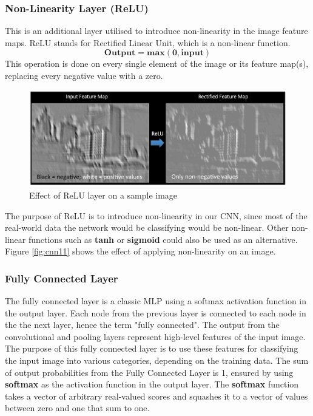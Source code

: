 \subsubsection*{Non-Linearity Layer (ReLU)}
\label{sect5_1_2_1a_c}
This is an additional layer utilised to introduce non-linearity in the image feature maps. ReLU stands for Rectified Linear Unit, which is a non-linear function.
\begin{equation}
\mathbf{Output = max(0, input)}
\end{equation}
This operation is done on every single element of the image or its feature map(s), replacing every negative value with a zero.
\begin{figure}[h!]
\centering
\includegraphics[width=12cm]{figures/Effect_ReLu.png}
\caption{Effect of ReLU layer on a sample image}
\label{fig:cnn13}
\end{figure}
The purpose of ReLU is to introduce non-linearity in our CNN, since most of the real-world data the network would be classifying would be non-linear. Other non-linear functions such as \textbf{tanh} or \textbf{sigmoid} could also be used as an alternative. Figure \ref{fig:cnn11} shows the effect of applying non-linearity on an image.

\subsubsection*{Fully Connected Layer}
\label{sect5_1_2_1a_d}

The fully connected layer is a classic \ac{MLP} using a softmax activation function in the output layer. Each node from the previous layer is connected to each node in the the next layer, hence the term "fully connected".\newline\newline
The output from the convolutional and pooling layers represent high-level features of the input image. The purpose of this fully connected layer is to use these features for classifying the input image into various categories, depending on the training data. \newline\newline
The sum of output probabilities from the Fully Connected Layer is 1, ensured by using \textbf{softmax} as the activation function in the output layer. The \textbf{softmax} function takes a vector of arbitrary real-valued scores and squashes it to a vector of values between zero and one that sum to one.

